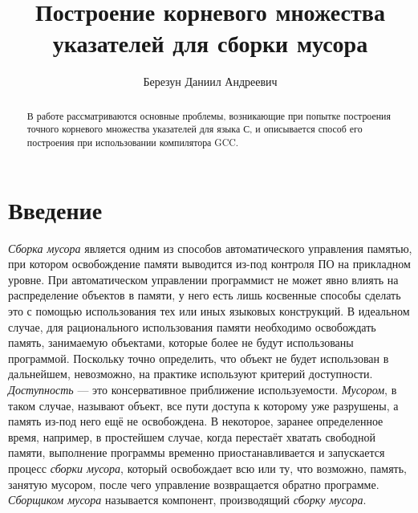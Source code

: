 
\lstset{
language=llang
}

\title{Построение корневого множества указателей для сборки мусора}
%
\author{Березун Даниил Андреевич}
%
%
%

\maketitle              %

\begin{abstract}
В работе рассматриваются основные проблемы, возникающие при попытке построения
точного корневого множества указателей для языка С, и описывается способ
его построения при использовании компилятора GCC.
\end{abstract}
%

\section*{Введение}

\emph{Сборка мусора} является одним из способов автоматического управления памятью, при котором освобождение памяти 
выводится из-под контроля ПО на прикладном уровне. При автоматическом управлении программист не может явно влиять на 
распределение объектов в памяти, у него есть лишь косвенные способы сделать это с помощью использования тех или иных
языковых конструкций. В идеальном случае, для рационального использования памяти необходимо освобождать память, занимаемую 
объектами, которые более не будут использованы программой. Поскольку точно определить, что объект не будет использован в дальнейшем, 
невозможно, на практике используют критерий доступности. \emph{Доступность} --- это консервативное приближение используемости. 
\emph{Мусором}, в таком случае, называют объект, все пути доступа к которому уже разрушены, а память из-под него ещё не освобождена. 
В некоторое, заранее определенное время, например, в простейшем случае, когда перестаёт хватать свободной памяти, выполнение 
программы временно приостанавливается и запускается процесс \emph{сборки мусора}, который освобождает всю или ту, что возможно, 
память, занятую мусором, после чего управление возвращается обратно программе. \emph{Сборщиком мусора} называется компонент, 
производящий \emph{сборку мусора}.

